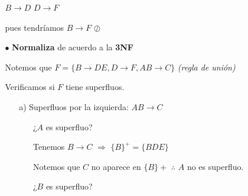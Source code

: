 \documentclass[12pt, letterpaper]{article}
\begin{document}
\begin{itemize}
\begin{itemize}
\begin{itemize}
                                        \begin{center}
                                            $B \rightarrow D$ \hspace{.5cm} $D\rightarrow F$
                                        \end{center}

                                        pues tendríamos $B \rightarrow F$ $\oslash$ \vspace{.2cm}
                         
                        \item[$\bullet$] \textbf{Normaliza} de acuerdo a la 
                                        \textbf{3NF} \vspace{.3cm}

                                        Notemos que $F=\{B \rightarrow DE, D\rightarrow F, AB\rightarrow C\}$ \textit{(regla de unión)} \vspace{.3cm}

                                        Verificamos si $F$ tiene superfluos.\vspace{.2cm}

                                        \begin{itemize}

                                            \item[a)] Superfluos por la izquierda: $AB\rightarrow C$
                                             
                                                      \begin{enumerate}

                                                          \item[] ¿$A$ es superfluo? \vspace{.1cm}
                                                           
                                                                  Tenemos $B \rightarrow C$ $\Rightarrow$ $\{B\}^+=\{BDE\}$ \vspace{.1cm}

                                                                  Notemos que $C$ no aparece en $\{B\}+$ $\therefore$ $A$ no es superfluo. \vspace{.2cm}

                                                          \item[] ¿$B$ es superfluo? \vspace{.1cm}
                                                                    

\end{enumerate}
\end{itemize}
\end{itemize}
\end{itemize}
\end{itemize}
\end{document}
